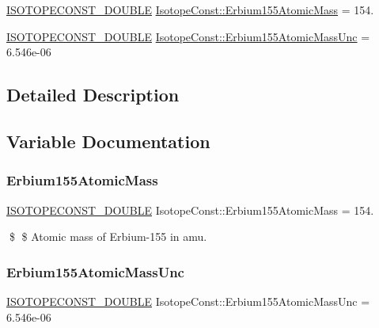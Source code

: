 \begin{DoxyCompactItemize}
\item 
\mbox{\hyperlink{group___isotope_const-_macros_ga8f45a7272ce02c0b4c65c44636ed719a}{I\+S\+O\+T\+O\+P\+E\+C\+O\+N\+S\+T\+\_\+\+D\+O\+U\+B\+LE}} \mbox{\hyperlink{group___isotope_const-_erbium-_er155_gaf0c963407a56ce41c249a881c1ed7799}{Isotope\+Const\+::\+Erbium155\+Atomic\+Mass}} = 154.
\item 
\mbox{\hyperlink{group___isotope_const-_macros_ga8f45a7272ce02c0b4c65c44636ed719a}{I\+S\+O\+T\+O\+P\+E\+C\+O\+N\+S\+T\+\_\+\+D\+O\+U\+B\+LE}} \mbox{\hyperlink{group___isotope_const-_erbium-_er155_ga31810928626b2c9c398080aef4b359c4}{Isotope\+Const\+::\+Erbium155\+Atomic\+Mass\+Unc}} = 6.\+546e-\/06
\end{DoxyCompactItemize}


\subsection{Detailed Description}


\subsection{Variable Documentation}
\mbox{\label{group___isotope_const-_erbium-_er155_gaf0c963407a56ce41c249a881c1ed7799}} 
\subsubsection{\texorpdfstring{Erbium155\+Atomic\+Mass}{Erbium155AtomicMass}}
{\footnotesize\ttfamily \mbox{\hyperlink{group___isotope_const-_macros_ga8f45a7272ce02c0b4c65c44636ed719a}{I\+S\+O\+T\+O\+P\+E\+C\+O\+N\+S\+T\+\_\+\+D\+O\+U\+B\+LE}} Isotope\+Const\+::\+Erbium155\+Atomic\+Mass = 154.}

\$ \$ Atomic mass of Erbium-\/155 in amu. \mbox{\label{group___isotope_const-_erbium-_er155_ga31810928626b2c9c398080aef4b359c4}} 
\subsubsection{\texorpdfstring{Erbium155\+Atomic\+Mass\+Unc}{Erbium155AtomicMassUnc}}
{\footnotesize\ttfamily \mbox{\hyperlink{group___isotope_const-_macros_ga8f45a7272ce02c0b4c65c44636ed719a}{I\+S\+O\+T\+O\+P\+E\+C\+O\+N\+S\+T\+\_\+\+D\+O\+U\+B\+LE}} Isotope\+Const\+::\+Erbium155\+Atomic\+Mass\+Unc = 6.\+546e-\/06}

